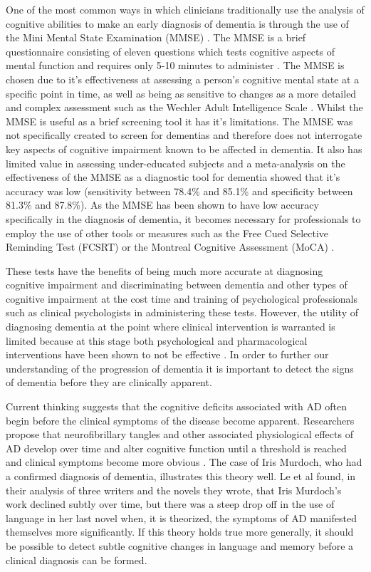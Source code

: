 \par
One of the most common ways in which clinicians traditionally use the analysis of cognitive abilities to make an early diagnosis of dementia is through the use of the Mini Mental State Examination (MMSE) \cite{Folstein1975}. The MMSE is a brief questionnaire consisting of eleven questions which tests cognitive aspects of mental function and requires only 5-10 minutes to administer \cite{Folstein1975}. The MMSE is chosen due to it's effectiveness at assessing a person's cognitive mental state at a specific point in time, as well as being as sensitive to changes as a more detailed and complex assessment such as the Wechler Adult Intelligence Scale \cite{Folstein1975}. Whilst the MMSE is useful as a brief screening tool it has it's limitations. The MMSE was not specifically created to screen for dementias and therefore does not interrogate key aspects of cognitive impairment known to be affected in dementia. It also has limited value in assessing under-educated subjects and a meta-analysis on the effectiveness of the MMSE as a diagnostic tool for dementia showed that it's accuracy was low (sensitivity between 78.4\% and 85.1\% and specificity between 81.3\% and 87.8\%). As the MMSE has been shown to have low accuracy specifically in the diagnosis of dementia, it becomes necessary for professionals to employ the use of other tools or measures such as the Free Cued Selective Reminding Test (FCSRT) \cite{Grober2010} or the Montreal Cognitive Assessment (MoCA) \cite{Davis2015}.
\par 
These tests have the benefits of being much more accurate at diagnosing cognitive impairment and discriminating between dementia and other types of cognitive impairment at the cost time and training of psychological professionals such as clinical psychologists in administering these tests. However, the utility of diagnosing dementia at the point where clinical intervention is warranted is limited because at this stage both psychological and pharmacological interventions have been shown to not be effective \cite{Prince2015, Cummings2014}. In order to further our understanding of the progression of dementia it is important to detect the signs of dementia before they are clinically apparent.  
\par 
Current thinking suggests that the cognitive deficits associated with AD often begin before the clinical symptoms of the disease become apparent. Researchers propose that neurofibrillary tangles and other associated physiological effects of AD develop over time and alter cognitive function until a threshold is reached and clinical symptoms become more obvious \cite{Nestor2006}. The case of Iris Murdoch, who had a confirmed diagnosis of dementia, illustrates this theory well. Le et al \cite{Le2011} found, in their analysis of three writers and the novels they wrote, that Iris Murdoch's work declined subtly over time, but there was a steep drop off in the use of language in her last novel when, it is theorized, the symptoms of AD manifested themselves more significantly. If this theory holds true more generally, it should be possible to detect subtle cognitive changes in language and memory before a clinical diagnosis can be formed.
